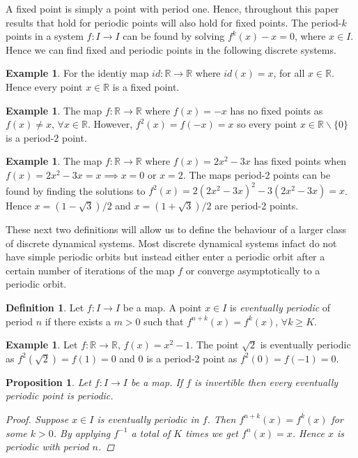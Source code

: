 \documentclass[11pt,a4paper,oneside]{memoir}
\theoremstyle{plain}
\newtheorem{prop}[thm]{Proposition}
\theoremstyle{definition}
\newtheorem{defn}[thm]{Definition}
\newtheorem{exmp}[thm]{Example}
\begin{document}
A fixed point is simply a point with period one. Hence, throughout this paper results that hold for periodic points will also hold for fixed points. The period-$k$ points in a system $f: I \to I$ can be found by solving $f^k(x) - x = 0$, where $x \in I$. Hence we can find fixed and periodic points in the following discrete systems.

\begin{exmp}
    For the identiy map $id: \mathbb{R} \to \mathbb{R}$ where $id(x) = x$, for all $x \in \mathbb{R}$. Hence every point $x \in \mathbb{R}$ is a fixed point.
\end{exmp}

\begin{exmp}
    The map $f: \mathbb{R} \to \mathbb{R}$ where $f(x) = -x$ has no fixed points as $f(x) \neq x$, $\forall x \in \mathbb{R}$. However, $f^2(x) = f(-x) = x$ so every point $x \in \mathbb{R} \backslash \lbrace 0 \rbrace$ is a period-$2$ point.
\end{exmp}

\begin{exmp}
The map $f: \mathbb{R} \to \mathbb{R}$ where $f(x) = 2x^2 - 3x$ has fixed points when $f(x) = 2x^2 - 3x = x \implies x = 0$ or $x = 2$. The maps period-2 points can be found by finding the solutions to $f^2(x) = 2(2x^2 -3x)^2 - 3(2x^2 - 3x) = x$. Hence $x = (1 - \sqrt{3}) / 2$ and $x = (1 + \sqrt{3})/2$ are period-2 points.
\end{exmp}

These next two definitions will allow us to define the behaviour of a larger class of discrete dynamical systems. Most discrete dynamical systems infact do not have simple periodic orbits but instead either enter a periodic orbit after a certain number of iterations of the map $f$ or converge asymptotically to a periodic orbit.

\begin{defn}
    Let $f: I \to I$ be a map. A point $x \in I$ is \emph{eventually periodic} of period $n$ if there exists a $m > 0$ such that $f^{n+k}(x) = f^k(x)$, $\forall k \geq K$.
\end{defn}

\begin{exmp}
    Let $f: \mathbb{R} \to \mathbb{R}$, $f(x) = x^2 - 1$. The point $\sqrt{2}$ is eventually periodic as $f^2(\sqrt{2}) = f(1) = 0$ and $0$ is a period-2 point as $f^2(0) = f(-1) = 0$.
\end{exmp}

\begin{prop}
    Let $f: I \to I$ be a map. If $f$ is invertible then every eventually periodic point is periodic.
    \begin{proof}
        Suppose $x \in I$ is eventually periodic in $f$. Then $f^{n+k}(x) = f^k(x)$ for some $k > 0$. By applying $f^{-1}$ a total of $K$ times we get $f^n(x) = x$. Hence $x$ is periodic with period $n$.
    \end{proof}
\end{prop}
\end{document}
